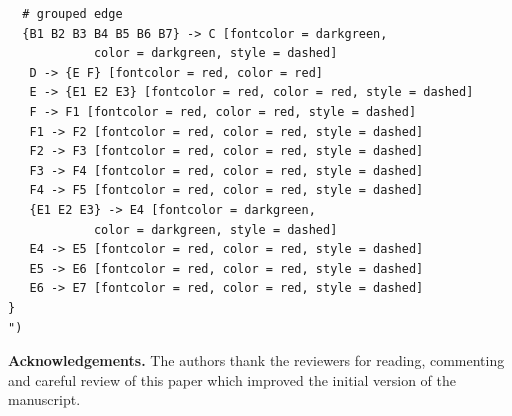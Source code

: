 \documentclass[12pt,a4paper,oneside]{article}
\def \newsection{\vspace{12pt}\textbf}
\begin{document}
\begin{lstlisting}
  # grouped edge
  {B1 B2 B3 B4 B5 B6 B7} -> C [fontcolor = darkgreen, 
  			color = darkgreen, style = dashed]
   D -> {E F} [fontcolor = red, color = red]
   E -> {E1 E2 E3} [fontcolor = red, color = red, style = dashed]
   F -> F1 [fontcolor = red, color = red, style = dashed]
   F1 -> F2 [fontcolor = red, color = red, style = dashed]
   F2 -> F3 [fontcolor = red, color = red, style = dashed]
   F3 -> F4 [fontcolor = red, color = red, style = dashed]
   F4 -> F5 [fontcolor = red, color = red, style = dashed]
   {E1 E2 E3} -> E4 [fontcolor = darkgreen,
   			color = darkgreen, style = dashed]
   E4 -> E5 [fontcolor = red, color = red, style = dashed]
   E5 -> E6 [fontcolor = red, color = red, style = dashed]
   E6 -> E7 [fontcolor = red, color = red, style = dashed]
}
")
\end{lstlisting}

{\bf Acknowledgements.} The authors thank the reviewers for reading, commenting and careful review of this paper which improved the initial version of the manuscript. 

%
%
%


\end{document}

